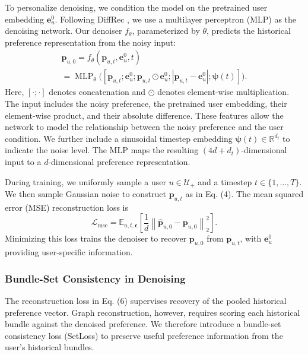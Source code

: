 \documentclass[letterpaper]{article}
\begin{document}
To personalize denoising, we condition the model on the pretrained user embedding $\mathbf e_u^0$. Following DiffRec \cite{wang2023diffrec}, we use a multilayer perceptron (MLP) as the denoising network. Our denoiser $f_\theta$, parameterized by $\theta$, predicts the historical preference representation from the noisy input:
\begin{equation}
\begin{gathered}
\widehat{\mathbf p}_{u,0}
=f_\theta(\mathbf p_{u,t},\mathbf e_u^0,t)\\
=\operatorname{MLP}_\theta\!\bigl(
[\mathbf p_{u,t};\mathbf e_u^0;
\mathbf p_{u,t}\odot\mathbf e_u^0;
|\mathbf p_{u,t}-\mathbf e_u^0|;\boldsymbol\psi(t)]
\bigr).
\end{gathered}
\tag{5}
\end{equation}
Here, $[\cdot;\cdot]$ denotes concatenation and $\odot$ denotes element-wise multiplication. The input includes the noisy preference, the pretrained user embedding, their element-wise product, and their absolute difference. These features allow the network to model the relationship between the noisy preference and the user condition. We further include a sinusoidal timestep embedding $\boldsymbol\psi(t)\in\mathbb R^{d_t}$ to indicate the noise level. The MLP maps the resulting $(4d+d_t)$-dimensional input to a $d$-dimensional preference representation.

During training, we uniformly sample a user $u\in\mathcal U_+$ and a timestep $t\in\{1,\ldots,T\}$. We then sample Gaussian noise to construct $\mathbf p_{u,t}$ as in Eq. (4). The mean squared error (MSE) reconstruction loss is
\begin{equation}
\mathcal L_{\mathrm{mse}}
=\mathbb E_{u,t,\boldsymbol\epsilon}
\left[
\frac{1}{d}
\left\|\widehat{\mathbf p}_{u,0}-\mathbf p_{u,0}\right\|_2^2
\right].
\tag{6}
\end{equation}
Minimizing this loss trains the denoiser to recover $\mathbf p_{u,0}$ from $\mathbf p_{u,t}$, with $\mathbf e_u^0$ providing user-specific information.

\subsubsection{Bundle-Set Consistency in Denoising}

The reconstruction loss in Eq. (6) supervises recovery of the pooled historical preference vector. Graph reconstruction, however, requires scoring each historical bundle against the denoised preference. We therefore introduce a bundle-set consistency loss (SetLoss) to preserve useful preference information from the user's historical bundles.
\end{document}
